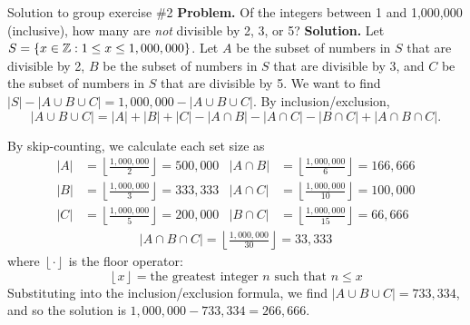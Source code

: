 \documentclass[10pt]{beamer}
\begin{document}
\begin{frame}{Solution to group exercise \#2}
\footnotesize 
\textbf{Problem.} Of the integers between 1 and 1,000,000 (inclusive), how many are \textit{not} divisible by 2, 3, or 5?
\vfill 
\textbf{Solution.}  Let $S=\{ {x \in \mathbb{Z} : 1 \leq x \leq 1,000,000} \}$.   Let $A$ be the subset of numbers in $S$ that are divisible by 2, $B$ be the subset of numbers in $S$ that are divisible by 3, and $C$ be the subset of numbers in $S$ that are divisible by 5.  We want to find $|S| - |A \cup B \cup C| = 1,000,000 - |A \cup B \cup C| $.  By inclusion/exclusion,
\[ 
|A \cup B \cup C| = |A| + |B| + |C| - |A \cap B| - |A \cap C| - |B \cap C| + |A \cap B \cap C|. \]

By skip-counting, we calculate each set size as
\begin{align*}
|A| &= \left\lfloor \frac{1,000,000}{2} \right\rfloor = 500,000 &  |A \cap B| &= \left\lfloor \frac{1,000,000}{6} \right\rfloor =166,666\\
|B| &= \left\lfloor \frac{1,000,000}{3} \right\rfloor = 333,333 &  |A \cap C| &= \left\lfloor \frac{1,000,000}{10} \right\rfloor =100,000\\
|C| &= \left\lfloor \frac{1,000,000}{5} \right\rfloor = 200,000 &  |B \cap C| &= \left\lfloor \frac{1,000,000}{15} \right\rfloor =66,666
\end{align*}
%
\begin{align*}
|A \cap B \cap C| = \left\lfloor \frac{1,000,000}{30} \right\rfloor =33,333	
\end{align*}
%
where $\left\lfloor \cdot  \right\rfloor$ is the floor operator:
\[ \left\lfloor  x \right\rfloor = \text {the greatest integer $n$ such that $n \leq x$} \]
Substituting into the inclusion/exclusion formula, we find $|A \cup B \cup C|=733,334$, and so the solution is $1,000,000 - 733,334 = 266,666.$
\end{frame}
\end{document}
